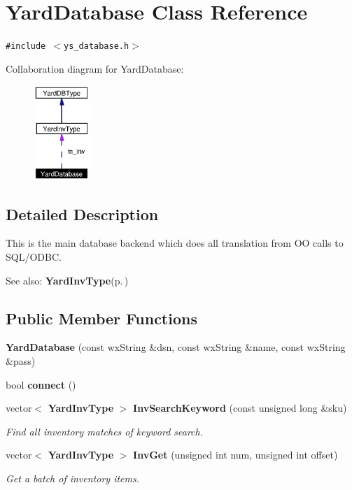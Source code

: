 \section{Yard\-Database Class Reference}
\label{classYardDatabase}
{\tt \#include $<$ys\_\-database.h$>$}

Collaboration diagram for Yard\-Database:\begin{figure}[H]
\begin{center}
\leavevmode
\includegraphics[width=60pt]{classYardDatabase__coll__graph}
\end{center}
\end{figure}


\subsection{Detailed Description}
This is the main database backend which does all translation from OO calls to SQL/ODBC. 

\begin{Desc}
\item[See also:]{\bf Yard\-Inv\-Type}{\rm (p.\,\pageref{classYardInvType})} \end{Desc}


\subsection*{Public Member Functions}
\begin{CompactItemize}
\item 
{\bf Yard\-Database} (const wx\-String \&dsn, const wx\-String \&name, const wx\-String \&pass)\label{classYardDatabase_a0}

\item 
bool {\bf connect} ()\label{classYardDatabase_a2}

\item 
vector$<$ {\bf Yard\-Inv\-Type} $>$ {\bf Inv\-Search\-Keyword} (const unsigned long \&sku)
\begin{CompactList}\small\item\em Find all inventory matches of keyword search. \item\end{CompactList}\item 
vector$<$ {\bf Yard\-Inv\-Type} $>$ {\bf Inv\-Get} (unsigned int num, unsigned int offset)
\begin{CompactList}\small\item\em Get a batch of inventory items. \item\end{CompactList}\end{CompactItemize}


